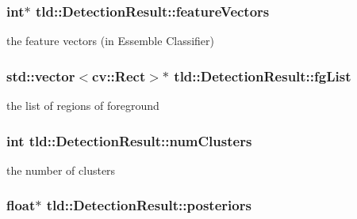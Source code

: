\hypertarget{classtld_1_1DetectionResult_a2650bfbdb106c7dd9b774cfccf5fdb25}{
\subsubsection[{feature\-Vectors}]{\setlength{\rightskip}{0pt plus 5cm}int$\ast$ tld\-::\-Detection\-Result\-::feature\-Vectors}}\label{classtld_1_1DetectionResult_a2650bfbdb106c7dd9b774cfccf5fdb25}


the feature vectors (in Essemble Classifier) 

\hypertarget{classtld_1_1DetectionResult_ac640285c436ff5166d0ea34116d4dc69}{
\subsubsection[{fg\-List}]{\setlength{\rightskip}{0pt plus 5cm}std\-::vector$<$cv\-::\-Rect$>$$\ast$ tld\-::\-Detection\-Result\-::fg\-List}}\label{classtld_1_1DetectionResult_ac640285c436ff5166d0ea34116d4dc69}


the list of regions of foreground 

\hypertarget{classtld_1_1DetectionResult_aebf70a6b9d27b4cb34248ac26e5876ab}{
\subsubsection[{num\-Clusters}]{\setlength{\rightskip}{0pt plus 5cm}int tld\-::\-Detection\-Result\-::num\-Clusters}}\label{classtld_1_1DetectionResult_aebf70a6b9d27b4cb34248ac26e5876ab}


the number of clusters 

\hypertarget{classtld_1_1DetectionResult_abe6b7a8cc4478cce6351207939e96333}{
\subsubsection[{posteriors}]{\setlength{\rightskip}{0pt plus 5cm}float$\ast$ tld\-::\-Detection\-Result\-::posteriors}}\label{classtld_1_1DetectionResult_abe6b7a8cc4478cce6351207939e96333}



